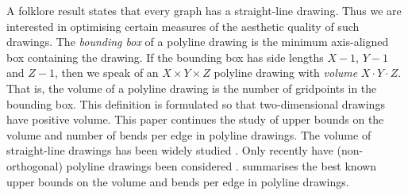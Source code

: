 \documentclass[10pt,a4paper]{article}
\begin{document}
A folklore result states that every graph has a straight-line drawing. Thus we
are interested in optimising certain  measures of the aesthetic quality of such
drawings.  The \emph{bounding box} of a polyline drawing  is the minimum
axis-aligned box containing the drawing. If the bounding box has side lengths
$X-1$, $Y-1$ and $Z-1$, then  we speak of an $X\times Y\times Z$ polyline
drawing with \emph{volume} $X\cdot Y\cdot Z$. That is, the volume of a polyline
drawing is the number of gridpoints in the bounding box.   This definition is
formulated so that two-dimensional drawings have positive volume.  This paper
continues the study of upper bounds on the volume  and number of bends per edge
in polyline drawings. The volume of straight-line drawings has been widely
studied \citep{DujWoo-SubQuad-AMS, Giacomo-GD03, DM-GD03, Hasunuma-GD03,
DujWoo-WG03, Wood-FSTTCS02, CS-IPL97, CELR-Algo96, DMW-GraphLayout, DMW-GD02,
FLW-GD01, PTT99, BCMW-JGAA}.  Only recently have (non-orthogonal) polyline
drawings been considered \citep{DujWoo-Subdivisions,Wismath-TR04}.
 summarises the best known upper bounds on the volume
and bends per edge in polyline drawings. 
\end{document}
